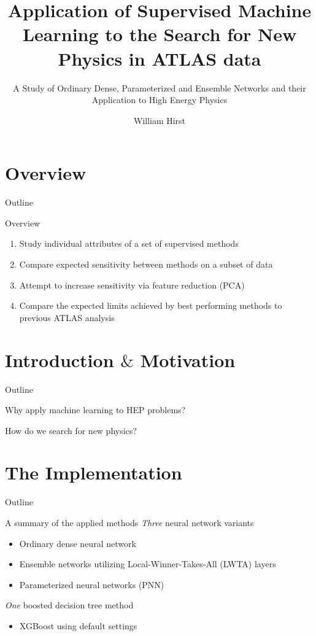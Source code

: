 \documentclass[UKenglish]{beamer}
\author{William Hirst}
\title[Supervised Learning in HEP]{Application of Supervised Machine Learning to the Search for New Physics in ATLAS data}
\subtitle{A Study of Ordinary Dense, Parameterized and Ensemble Networks and their Application to High Energy Physics}
\begin{document}
\section{Overview}

\begin{frame}{Outline}
    \tableofcontents
\end{frame}

\begin{frame}{Overview}
    \begin{enumerate}
        \item Study individual attributes of a set of supervised methods 
        \item Compare expected sensitivity between methods on a subset of data
        \item Attempt to increase sensitivity via feature reduction (PCA)
        \item Compare the expected limits achieved by best performing methods 
              to previous ATLAS analysis
    \end{enumerate}
\end{frame}
\section{Introduction $\&$ Motivation}
\begin{frame}{Outline}
    \tableofcontents[currentsection]
\end{frame}

\begin{frame}{Why apply machine learning to HEP problems?}
 
\end{frame}


\begin{frame}{How do we search for new physics?}
 
\end{frame}

\section{The Implementation}
\begin{frame}{Outline}
    \tableofcontents[currentsection]
\end{frame}

\begin{frame}{A summary of the applied methods}
    \emph{Three} neural network variants
    \begin{itemize}
        \item Ordinary dense neural network
        \item Ensemble networks utilizing Local-Winner-Takes-All (LWTA) layers
        \item Parameterized neural networks (PNN)
    \end{itemize}
    \emph{One} boosted decision tree method
    \begin{itemize}
        \item XGBoost using default settings
    \end{itemize}
\end{frame}
\end{document}

